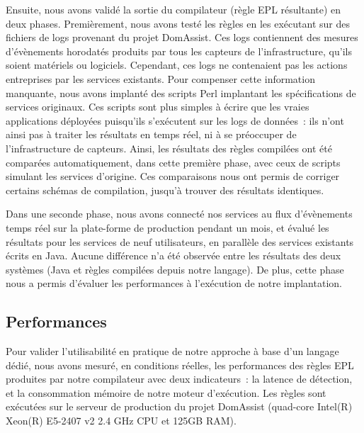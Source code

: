 Ensuite, nous avons validé la sortie du compilateur (\ie règle EPL
résultante) en deux phases. Premièrement, nous avons testé les règles
en les exécutant sur des fichiers de logs provenant du projet
DomAssist. Ces logs contiennent des mesures d'évènements horodatés
produits par tous les capteurs de l'infrastructure, qu'ils soient
matériels ou logiciels. Cependant, ces logs ne contenaient pas les
actions entreprises par les services existants. Pour compenser cette
information manquante, nous avons implanté des scripts Perl implantant
les spécifications de services originaux.  Ces scripts sont plus
simples à écrire que les vraies applications déployées puisqu'ils
s'exécutent sur les logs de données~: ils n'ont ainsi pas à traiter les
résultats en temps réel, ni à se préoccuper de l'infrastructure de
capteurs.  Ainsi, les résultats des règles compilées ont été comparées
automatiquement, dans cette première phase, avec ceux de scripts
simulant les services d'origine.  Ces comparaisons nous ont permis de
corriger certains schémas de compilation, jusqu'à trouver des
résultats identiques.


Dans une seconde phase, nous avons connecté nos services au flux
d'évènements temps réel sur la plate-forme de production pendant un
mois, et évalué les résultats pour les services de neuf utilisateurs,
en parallèle des services existants écrits en Java. Aucune différence
n'a été observée entre les résultats des deux systèmes (Java et règles
compilées depuis notre langage). De plus, cette phase nous a permis
d'évaluer les performances à l'exécution de notre implantation.

\subsection{Performances}\label{validation:performance}
Pour valider l'utilisabilité en pratique de notre approche à base d'un
langage dédié, nous avons mesuré, en conditions réelles, les
performances des règles EPL produites par notre compilateur avec deux
indicateurs~: la latence de détection, et la consommation mémoire de
notre moteur d'exécution. Les règles sont exécutées sur le serveur de
production du projet DomAssist (quad-core Intel(R) Xeon(R) E5-2407 v2
2.4 GHz CPU et 125GB RAM).


